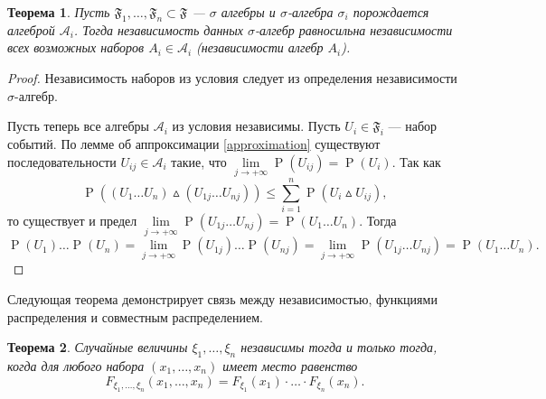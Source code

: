 \documentclass[12pt]{article}
\newtheorem{theorem}{Теорема}
\numberwithin{theorem}{section}
\theoremstyle{definition}
\newcommand{\calA}{\mathcal{A}}
\newcommand{\prob}{\operatorname{P}}
\newcommand{\events}{\mathfrak{F}}
\begin{document}
	\begin{theorem} \label{indep of algs => indep of min sigma algs}
		Пусть $ \events_1, \ldots, \events_n \subset \events $ --- $ \sigma $ алгебры
		и $ \sigma $-алгебра $ \sigma_i $ порождается алгеброй $ \calA_i $.
		Тогда независимость данных $ \sigma $-алгебр равносильна независимости
		всех возможных наборов $ A_i \in \calA_i $ (независимости алгебр $ A_i $).
	\end{theorem}
	
	\begin{proof}
		Независимость наборов из условия следует из определения независимости $ \sigma $-алгебр.
		
		Пусть теперь все алгебры $ \calA_i $ из условия независимы.
		Пусть $ U_i \in \events_i $ --- набор событий.
		По лемме об аппроксимации \ref{approximation} существуют последовательности
		$ U_{ij} \in \calA_i $ такие, что $ \lim\limits_{j \to +\infty}{\prob(U_{ij})} = \prob(U_i) $.
		Так как $$ \prob((U_1\ldots U_n) \vartriangle (U_{1j}\ldots U_{nj})) \leqslant
		\sum\limits_{i = 1}^{n} \prob(U_i \vartriangle U_{ij}), $$
		то существует и предел $ \lim\limits_{j \to +\infty}{\prob(U_{1j}\ldots U_{nj})} = \prob(U_1\ldots U_n) $.
		Тогда $$ \prob(U_1)\ldots\prob(U_n) 
		= \lim\limits_{j \to +\infty} {\prob(U_{1j})\ldots\prob(U_{nj})}
		= \lim\limits_{j \to +\infty} {\prob(U_{1j}\ldots U_{nj})}
		= \prob(U_1\ldots U_n). $$
	\end{proof}
	
	Следующая теорема демонстрирует связь между независимостью, функциями распределения и совместным распределением.
	
	\begin{theorem} \label{independence through distribution functions}
		Случайные величины $ \xi_1, \ldots, \xi_n $ 
		независимы тогда и только тогда, когда для любого набора $ (x_1, \ldots, x_n) $ 
		имеет место равенство
		$$ F_{\xi_1, \ldots, \xi_n}(x_1, \ldots, x_n) = F_{\xi_1}(x_1) \cdot \ldots \cdot F_{\xi_n}(x_n). $$
	\end{theorem}
	
\end{document}
